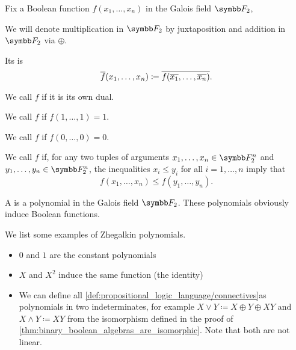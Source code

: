 \begin{definition}\label{def:boolean_functions_in_f2}
  Fix a Boolean function \( f(x_1, \ldots, x_n) \) in the Galois field \( \BF_2 \),

  We will denote multiplication in \( \BF_2 \) by juxtaposition and addition in \( \BF_2 \) via \( \oplus \).

  \begin{defenum}
     Its  is
    \begin{equation*}
       \overline{f}(x_1, \ldots, x_n) \coloneqq \overline{f(\overline{x_1}, \ldots, \overline{x_n})}.
    \end{equation*}

     We call \( f \)  if it is its own dual.

     We call \( f \) if \( f(1, \ldots, 1) = 1 \).

     We call \( f \) if \( f(0, \ldots, 0) = 0 \).

     We call \( f \)  if, for any two tuples of arguments \( x_1, \ldots, x_n \in \BF_2^n \) and \( y_1, \ldots, y_n \in \BF_2^n \), the inequalities \( x_i \leq y_i \) for all \( i = 1, \ldots, n \) imply that
    \begin{equation*}
      f(x_1, \ldots, x_n) \leq f(y_1, \ldots, y_n).
    \end{equation*}
  \end{defenum}
\end{definition}

\begin{definition}\label{def:zhegalkin_polynomial}
  A  is a polynomial in the Galois field \( \BF_2 \). These polynomials obviously induce Boolean functions.
\end{definition}

\begin{example}\label{ex:zhegalkin_polynomials}
  We list some examples of Zhegalkin polynomials.

  \begin{itemize}
    \item \( 0 \) and \( 1 \) are the constant polynomials
    \item \( X \) and \( X^2 \) induce the same function (the identity)
    \item We can define all \ref{def:propositional_logic_language/connectives}as polynomials in two indeterminates, for example \( X \lor Y \coloneqq X \oplus Y \oplus XY \) and \( X \land Y \coloneqq XY \) from the isomorphism defined in the proof of \cref{thm:binary_boolean_algebras_are_isomorphic}. Note that both are not linear.
  \end{itemize}
\end{example}

